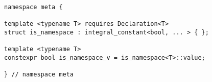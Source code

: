 
\begin{verbatim}
namespace meta {

template <typename T> requires Declaration<T>
struct is_namespace : integral_constant<bool, ... > { };

template <typename T>
constexpr bool is_namespace_v = is_namespace<T>::value;

} // namespace meta
\end{verbatim}
